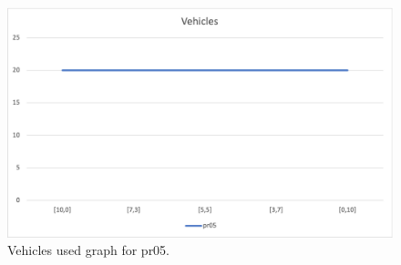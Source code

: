 \begin{figure}[H]
    \centering
    \includegraphics[width=1.0\columnwidth]{../graphs/pr05-vehicles.png}
    \caption{Vehicles used graph for pr05.}
\end{figure}
